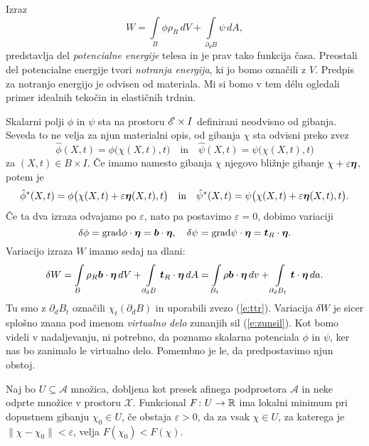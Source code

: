 Izraz
\begin{equation*}
	W = \int\limits_{B}\phi\rho_R\, dV + \int\limits_{\partial_d B}\psi\, dA,
\end{equation*}
predstavlja del \emph{potencialne energije} telesa in je prav tako funkcija časa.
Preostali del potencialne energije tvori \emph{notranja energija}, ki jo bomo označili z $V$.
Predpis za notranjo energijo je odvisen od materiala. Mi si bomo v tem délu ogledali primer
idealnih tekočin in elastičnih trdnin. 

Skalarni polji $\phi$ in $\psi$ sta na prostoru $\mathscr E\times I$ definirani neodvisno od gibanja.
Seveda to ne velja za njun materialni opis, od gibanja $\chi$ sta odvisni preko zvez
\[ \hat{\phi}(X,t)=\phi\big(\chi(X,t),t\big)\quad\textrm{in}\quad\hat{\psi}(X,t)=\psi\big(\chi(X,t),t\big) \]
za $(X,t)\in B\times I$.
Če imamo namesto gibanja $\chi$ njegovo bližnje gibanje $\chi+\varepsilon\boldsymbol \eta$, potem je
\[
	\hat{\phi}^*(X,t)=\phi\big(\chi(X,t)+\varepsilon\boldsymbol \eta(X,t),t\big)\quad\textrm{in}
	\quad\hat{\psi}^*(X,t)=\psi\big(\chi(X,t)+\varepsilon\boldsymbol \eta(X,t),t\big).
\]
Če ta dva izraza odvajamo po $\varepsilon$, nato pa postavimo $\varepsilon=0$, dobimo variaciji
\[
	\delta\phi=\mathrm{grad}\phi\cdot\boldsymbol \eta=\boldsymbol b\cdot\boldsymbol \eta,\quad
	\delta\psi=\mathrm{grad}\psi\cdot\boldsymbol \eta=\boldsymbol t_R\cdot\boldsymbol \eta.
\]
Variacijo izraza $W$ imamo sedaj na dlani:
\begin{equation} \label{e:varvide}
	\delta W = \int\limits_{B}\rho_R\boldsymbol b\cdot\boldsymbol \eta\, dV + \int\limits_{\partial_d B}\boldsymbol t_R\cdot\boldsymbol \eta\, dA=
	\int\limits_{B_t}\rho\boldsymbol b\cdot\boldsymbol \eta\, dv + \int\limits_{\partial_d B_t}\boldsymbol t\cdot\boldsymbol \eta\, da.
\end{equation}
Tu smo z $\partial_d B_t$ označili $\chi_t(\partial_d B)$ in uporabili zvezo (\ref{e:ttr}).
Variacija $\delta W$ je sicer splošno znana
pod imenom \emph{virtualno delo} zunanjih sil (\ref{e:zunsil}). Kot bomo videli v nadaljevanju,
ni potrebno, da poznamo skalarna potenciala $\phi$ in $\psi$, ker nas bo zanimalo le virtualno delo.
Pomembno je le, da predpostavimo njun obstoj.

\begin{definicija}
	Naj bo $U\subseteq\mathcal{A}$ množica, dobljena kot presek afinega podprostora $\mathcal{A}$ in
	neke odprte množice v prostoru $\mathcal{X}$.
	Funkcional $F\colon U\to\mathbb R$ ima lokalni minimum pri dopustnem gibanju $\chi_{0}\in U$, če obstaja $\varepsilon >0$,
	da za vsak $\chi\in U$, za katerega je $\|\chi-\chi_{0}\|<\varepsilon$, velja $F(\chi_{0})<F(\chi)$.
\end{definicija}

